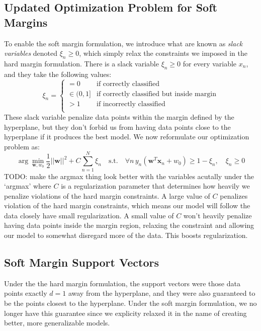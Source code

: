 \subsection{Updated Optimization Problem for Soft Margins}
To enable the soft margin formulation, we introduce what are known as \textit{slack variables} denoted $\xi_{n} \geq 0$, which simply relax the constraints we imposed in the hard margin formulation. There is a slack variable $\xi_{n} \geq 0$ for every variable $x_{n}$, and they take the following values:
\begin{equation} \label{slack-variable-values}
	\xi_{n} = \begin{cases}
	 	= 0 & \text{if correctly classified} \\
		\in (0, 1] & \text{if correctly classified but inside margin} \\
		> 1 & \text{if incorrectly classified} \\
	\end{cases}
\end{equation}
These slack variable penalize data points within the margin defined by the hyperplane, but they don't forbid us from having data points close to the hyperplane if it produces the best model. We now reformulate our optimization problem as:
\begin{equation} \label{soft-margin-optimization-problem}
	\arg\min_{\textbf{w}, w_{0}} \frac{1}{2} ||\textbf{w}||^{2} + C \sum_{n=1}^{N} \xi_{n} \quad \text{s.t.} \quad \forall n \, y_{n}(\textbf{w}^{T}\textbf{x}_{n} + w_{0}) \geq 1 - \xi_{n}, \quad \xi_{n} \geq 0
\end{equation}
TODO: make the argmax thing look better with the variables acutally under the `argmax' \newline \newline
where $C$ is a regularization parameter that determines how heavily we penalize violations of the hard margin constraints. A large value of $C$ penalizes violation of the hard margin constraints, which means our model will follow the data closely have small regularization. A small value of $C$ won't heavily penalize having data points inside the margin region, relaxing the constraint and allowing our model to somewhat disregard more of the data. This boosts regularization.


\subsection{Soft Margin Support Vectors}
Under the the hard margin formulation, the support vectors were those data points exactly $d=1$ away from the hyperplane, and they were also guaranteed to be the points closest to the hyperplane. Under the soft margin formulation, we no longer have this guarantee since we explicity relaxed it in the name of creating better, more generalizable models.


